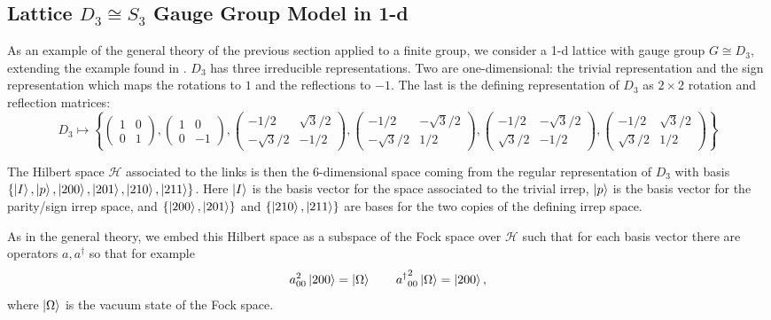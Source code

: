 \documentclass[10pt,reqno]{amsart}
\begin{document}
	\subsection{Lattice $D_3\cong S_3$ Gauge Group Model in 1-d}	
	
	As an example of the general theory of the previous section applied to a finite group, we consider a 1-d lattice with gauge group $G\cong D_3$, extending the example found in \cite[Appendix 1]{ZoharBurrello15}.
	$D_3$ has three irreducible representations.
	Two are one-dimensional: the trivial representation and the sign representation which maps the rotations to $1$ and the reflections to $-1$.
	The last is the defining representation of $D_3$ as $2\times 2$ rotation and reflection matrices:
		\[D_3 \mapsto \left\{ \begin{pmatrix}
		1 & 0\\ 0 & 1
		\end{pmatrix},
		\begin{pmatrix}
		1 & 0\\ 0 & -1
		\end{pmatrix},
		\begin{pmatrix}
		-1/2 & \sqrt{3}/2\\ -\sqrt{3}/2 & -1/2
		\end{pmatrix},
		\begin{pmatrix}
		-1/2 & -\sqrt{3}/2\\ -\sqrt{3}/2 & 1/2
		\end{pmatrix},
		\begin{pmatrix}
		-1/2 & -\sqrt{3}/2\\ \sqrt{3}/2 & -1/2
		\end{pmatrix},
		\begin{pmatrix}
		-1/2 & \sqrt{3}/2\\ \sqrt{3}/2 & 1/2
		\end{pmatrix} \right\} \]
		
	The Hilbert space $\mathcal{H}$ associated to the links is then the 6-dimensional space coming from the regular representation of $D_3$ with basis $\{ \ket{I},\ket{p},\ket{200},\ket{201},\ket{210},\ket{211} \}$.
	Here $\ket{I}$ is the basis vector for the space associated to the trivial irrep, $\ket{p}$ is the basis vector for the parity/sign irrep space, and $\{\ket{200},\ket{201}\}$ and $\{\ket{210},\ket{211}\}$ are bases for the two copies of the defining irrep space.
	
	As in the general theory, we embed this Hilbert space as a subspace of the Fock space over $\mathcal{H}$ such that for each basis vector there are operators $a,a^\dagger$ so that for example
		\[a^2_{00}\ket{200}=\ket{\Omega} \qquad {a^\dagger}_{00}^2\ket{\Omega}=\ket{200}, \]
	where $\ket{\Omega}$ is the vacuum state of the Fock space.
	
\end{document}
